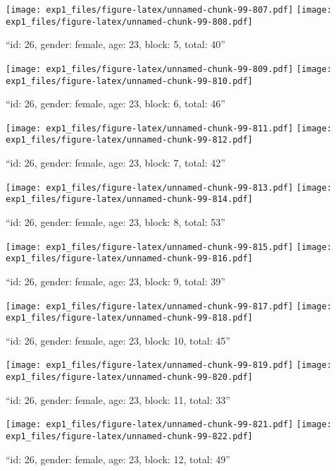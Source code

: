 \documentclass[,]{article}
\begin{document}
\texttt{[image: exp1\_files/figure-latex/unnamed-chunk-99-807.pdf]}
\texttt{[image: exp1\_files/figure-latex/unnamed-chunk-99-808.pdf]}

\newpage
[1] 

``id: 26, gender: female, age: 23, block: 5, total: 40''

\texttt{[image: exp1\_files/figure-latex/unnamed-chunk-99-809.pdf]}
\texttt{[image: exp1\_files/figure-latex/unnamed-chunk-99-810.pdf]}

\newpage
[1] 

``id: 26, gender: female, age: 23, block: 6, total: 46''

\texttt{[image: exp1\_files/figure-latex/unnamed-chunk-99-811.pdf]}
\texttt{[image: exp1\_files/figure-latex/unnamed-chunk-99-812.pdf]}

\newpage
[1] 

``id: 26, gender: female, age: 23, block: 7, total: 42''

\texttt{[image: exp1\_files/figure-latex/unnamed-chunk-99-813.pdf]}
\texttt{[image: exp1\_files/figure-latex/unnamed-chunk-99-814.pdf]}

\newpage
[1] 

``id: 26, gender: female, age: 23, block: 8, total: 53''

\texttt{[image: exp1\_files/figure-latex/unnamed-chunk-99-815.pdf]}
\texttt{[image: exp1\_files/figure-latex/unnamed-chunk-99-816.pdf]}

\newpage
[1] 

``id: 26, gender: female, age: 23, block: 9, total: 39''

\texttt{[image: exp1\_files/figure-latex/unnamed-chunk-99-817.pdf]}
\texttt{[image: exp1\_files/figure-latex/unnamed-chunk-99-818.pdf]}

\newpage
[1] 

``id: 26, gender: female, age: 23, block: 10, total: 45''

\texttt{[image: exp1\_files/figure-latex/unnamed-chunk-99-819.pdf]}
\texttt{[image: exp1\_files/figure-latex/unnamed-chunk-99-820.pdf]}

\newpage
[1] 

``id: 26, gender: female, age: 23, block: 11, total: 33''

\texttt{[image: exp1\_files/figure-latex/unnamed-chunk-99-821.pdf]}
\texttt{[image: exp1\_files/figure-latex/unnamed-chunk-99-822.pdf]}

\newpage
[1] 

``id: 26, gender: female, age: 23, block: 12, total: 49''
\end{document}
